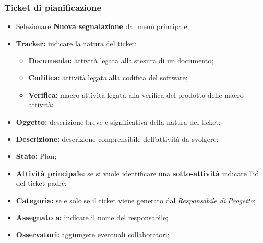       \subsubsection{Ticket di pianificazione}
        \begin{itemize}
          \item Selezionare \textbf{Nuova segnalazione} dal menù principale;
          \item \textbf{Tracker: }indicare la natura del ticket:
          \bgroup
            \begin{itemize}
              \item \textbf{Documento: }attività legata alla stesura di un documento;
              \item \textbf{Codifica: }attività legata alla  codifica del software;
              \item \textbf{Verifica: }macro-attività legata alla verifica del prodotto delle macro-attività;
            \end{itemize}
          \egroup
          \item \textbf{Oggetto: }descrizione breve e significativa della natura del ticket;
          \item \textbf{Descrizione: }descrizione comprensibile dell'attività da svolgere;
          \item \textbf{Stato: }Plan;
          \item \textbf{Attività principale: }se si vuole identificare una \textbf{sotto-attività} indicare l'id del ticket padre;
          \item \textbf{Categoria: } se e solo se il ticket viene generato dal \emph{Responsabile di Progetto};
          \item \textbf{Assegnato a: }indicare il nome del responsabile;
          \item \textbf{Osservatori: }aggiungere eventuali collaboratori;
        \end{itemize}
